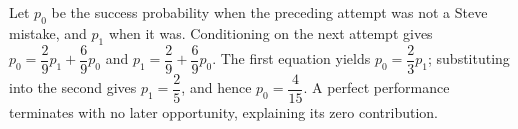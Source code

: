 Let $p_0$ be the success probability when the preceding attempt was not a Steve mistake, and $p_1$ when it was. Conditioning on the next attempt gives $p_0=\dfrac{2}{9}p_1+\dfrac{6}{9}p_0$ and $p_1=\dfrac{2}{9}+\dfrac{6}{9}p_0$. The first equation yields $p_0=\dfrac{2}{3}p_1$; substituting into the second gives $p_1=\dfrac{2}{5}$, and hence $\boxed{p_0=\dfrac{4}{15}}$. A perfect performance terminates with no later opportunity, explaining its zero contribution.
